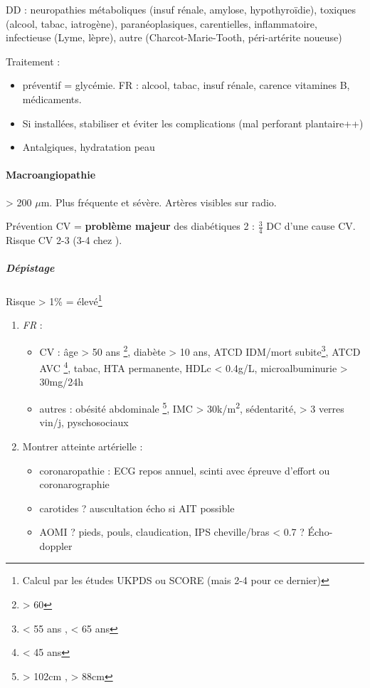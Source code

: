 \documentclass[11pt]{article}
\begin{document}
DD : neuropathies métaboliques (insuf rénale, amylose, hypothyroïdie), toxiques
(alcool, tabac, iatrogène), paranéoplasiques, carentielles, inflammatoire,
infectieuse (Lyme, lèpre), autre (Charcot-Marie-Tooth, péri-artérite noueuse)

Traitement : 
\begin{itemize}
\item préventif = glycémie. FR : alcool, tabac, insuf rénale, carence vitamines B, médicaments.
\item Si installées, stabiliser et éviter les complications (mal perforant plantaire++)
\item Antalgiques, hydratation peau
\end{itemize}

\paragraph{Macroangiopathie}
\label{sec:orgeaa975f}
\diameter > 200 \(\mu\)m. Plus fréquente et sévère. Artères visibles sur radio.

Prévention CV = \textbf{problème majeur} des diabétiques 2 : \(\frac{3}{4}\) DC d'une cause
CV. Risque CV \texttimes{}2-3 (\texttimes{}3-4 chez \female). 

\subparagraph{Dépistage}
\label{sec:org63de8a2}
Risque > 1\% = élevé\footnote{Calcul par les études UKPDS ou SCORE (mais \texttimes{}2-4 pour ce dernier)}

\begin{enumerate}
\item \emph{FR} :
\begin{itemize}
\item CV : âge > 50 ans \male \footnote{> 60 \female}, diabète > 10 ans, ATCD IDM/mort
subite\footnote{< 55 ans \male, < 65 ans \female}, ATCD AVC \footnote{< 45 ans},  tabac, HTA permanente, HDLc < 0.4g/L, microalbuminurie > 30mg/24h
\item autres : obésité abdominale \footnote{> 102cm \male, > 88cm \female}, IMC > 30k/m\textsuperscript{2}, sédentarité, > 3 verres vin/j, pyschosociaux
\end{itemize}

\item Montrer atteinte artérielle : 
\begin{itemize}
\item coronaropathie : ECG repos annuel, scinti avec épreuve d'effort ou coronarographie
\item carotides ? auscultation \thus écho si AIT possible
\item AOMI ? pieds, pouls, claudication, IPS cheville/bras < 0.7 ? Écho-doppler
\end{itemize}
\end{enumerate}
\end{document}
